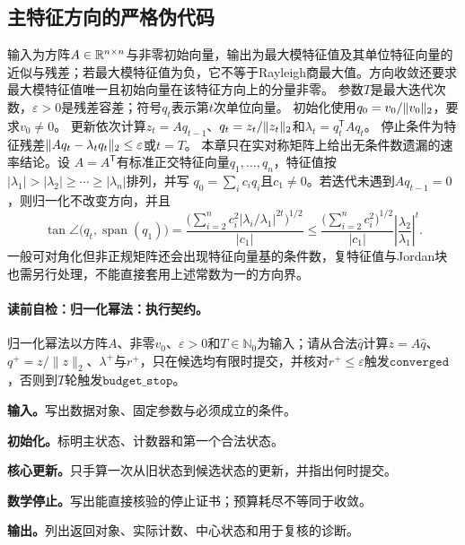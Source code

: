 \subsection*{主特征方向的严格伪代码}
\label{schema:V1-C02:CH-19}
\label{schema:V1-C02:CH-20}
输入为方阵$A\in\mathbb{R}^{n\times n}$与非零初始向量，输出为最大模特征值及其单位特征向量的近似与残差；若最大模特征值为负，它不等于Rayleigh商最大值。方向收敛还要求最大模特征值唯一且初始向量在该特征方向上的分量非零。
\label{schema:V1-C02:CH-21}
参数$T$是最大迭代次数，$\varepsilon>0$是残差容差；符号$q_t$表示第$t$次单位向量。
\label{schema:V1-C02:CH-22}
初始化使用$q_0=v_0/\lVert v_0\rVert_2$，要求$v_0\ne0$。
\label{schema:V1-C02:CH-23}
更新依次计算$z_t=Aq_{t-1}$、$q_t=z_t/\lVert z_t\rVert_2$和$\lambda_t=q_t^{\mathsf T}Aq_t$。
\label{schema:V1-C02:CH-24}
停止条件为特征残差$\lVert Aq_t-\lambda_tq_t\rVert_2\le\varepsilon$或$t=T$。
\label{schema:V1-C02:CH-25}
本章只在实对称矩阵上给出无条件数遗漏的速率结论。设
$A=A^{\mathsf T}$有标准正交特征向量$q_1,\ldots,q_n$，特征值按
$|\lambda_1|>|\lambda_2|\ge\cdots\ge|\lambda_n|$排列，并写
$q_0=\sum_i c_iq_i$且$c_1\ne0$。若迭代未遇到$Aq_{t-1}=0$，则归一化不改变方向，并且
\[
\tan\angle\!\bigl(q_t,\operatorname{span}(q_1)\bigr)
=\frac{\bigl(\sum_{i=2}^n c_i^2|\lambda_i/\lambda_1|^{2t}\bigr)^{1/2}}{|c_1|}
\le \frac{\bigl(\sum_{i=2}^n c_i^2\bigr)^{1/2}}{|c_1|}
\left|\frac{\lambda_2}{\lambda_1}\right|^t.
\]
一般可对角化但非正规矩阵还会出现特征向量基的条件数，复特征值与Jordan块也需另行处理，不能直接套用上述常数为一的方向界。

\paragraph{读前自检：归一化幂法：执行契约。}归一化幂法以方阵$A$、非零$v_0$、$\varepsilon>0$和$T\in\mathbb N_0$为输入；请从合法$\widehat q$计算$z=A\widehat q$、$q^+=z/\lVert z\rVert_2$、$\lambda^+$与$r^+$，只在候选均有限时提交，并核对$r^+\le\varepsilon$触发$\mathtt{converged}$，否则到$T$轮触发$\mathtt{budget\_stop}$。\par
\begin{keypointbox}[title={归一化幂法：五步阅读}]
\textbf{输入。}写出数据对象、固定参数与必须成立的条件。\par
\textbf{初始化。}标明主状态、计数器和第一个合法状态。\par
\textbf{核心更新。}只手算一次从旧状态到候选状态的更新，并指出何时提交。\par
\textbf{数学停止。}写出能直接核验的停止证书；预算耗尽不等同于收敛。\par
\textbf{输出。}列出返回对象、实际计数、中心状态和用于复核的诊断。
\end{keypointbox}

